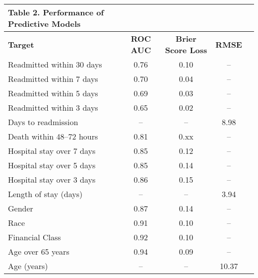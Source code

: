 \begin{adjustbox}{width={\textwidth},keepaspectratio,frame}%
{
\begin{tabular}{lcccc}
\rowcolor{NEJMTopRow} \multicolumn{4}{l}%
{{\textbf{\color{NEJMRed} Table 2.}}
\textbf{Performance of Predictive Models}} 
\\ %
\hline
\textbf{Target} & \textbf{ROC AUC} & \textbf{Brier Score Loss} &   \textbf{RMSE} \\
Readmitted within 30 days &    0.76 &              0.10 &        -- \\
Readmitted within 7 days  &    0.70 &              0.04 &        -- \\
Readmitted within 5 days  &    0.69 &              0.03 &        -- \\
Readmitted within 3 days  &    0.65 &              0.02 &        -- \\
Days to readmission       &      -- &                -- &      8.98 \\
Death within 48--72 hours  &    0.81 &              0.xx &        -- \\
Hospital stay over 7 days &    0.85 &              0.12 &        -- \\
Hospital stay over 5 days &    0.85 &              0.14 &        -- \\
Hospital stay over 3 days &    0.86 &              0.15 &        -- \\
Length of stay (days)     &      -- &                -- &      3.94 \\
Gender                    &    0.87 &              0.14 &        -- \\
Race                      &    0.91 &              0.10 &        -- \\
Financial Class           &    0.92 &              0.10 &        -- \\
Age over 65 years         &    0.94 &              0.09 &        -- \\
Age (years)               &      -- &                -- &     10.37 \\
\end{tabular}
\label{table:table2}
}
\end{adjustbox}



